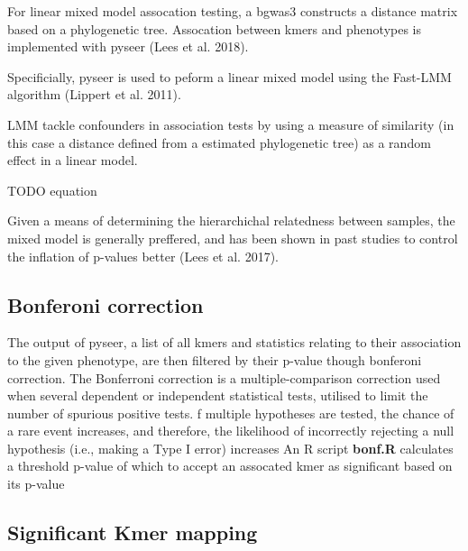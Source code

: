 \documentclass[]{article}
\begin{document}
For linear mixed model assocation testing, a bgwas3 constructs a
distance matrix based on a phylogenetic tree. Assocation between kmers
and phenotypes is implemented with pyseer (Lees et al. 2018).

Specificially, pyseer is used to peform a linear mixed model using the
Fast-LMM algorithm (Lippert et al. 2011).

LMM tackle confounders in association tests by using a measure of
similarity (in this case a distance defined from a estimated
phylogenetic tree) as a random effect in a linear model.

TODO equation

Given a means of determining the hierarchichal relatedness between
samples, the mixed model is generally preffered, and has been shown in
past studies to control the inflation of p-values better (Lees et al.
2017).

\hypertarget{bonferoni-correction}{%
\subsection{Bonferoni correction}\label{bonferoni-correction}}

The output of pyseer, a list of all kmers and statistics relating to
their association to the given phenotype, are then filtered by their
p-value though bonferoni correction. The Bonferroni correction is a
multiple-comparison correction used when several dependent or
independent statistical tests, utilised to limit the number of spurious
positive tests. f multiple hypotheses are tested, the chance of a rare
event increases, and therefore, the likelihood of incorrectly rejecting
a null hypothesis (i.e., making a Type I error) increases An R script
\textbf{bonf.R} calculates a threshold p-value of which to accept an
assocated kmer as significant based on its p-value

\hypertarget{significant-kmer-mapping}{%
\subsection{Significant Kmer mapping}\label{significant-kmer-mapping}}
\end{document}
